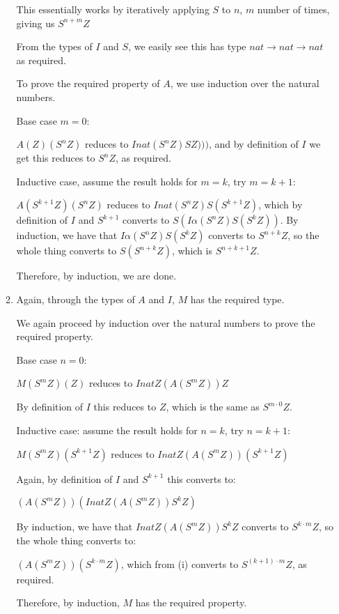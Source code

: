 \begin{enumerate}[label=(\alph*)]
\begin{enumerate}[label=(\roman*)]
                This essentially works by iteratively applying $S$ to $n$, $m$ number of times, giving us $S^{n+m}Z$

                From the types of $I$ and $S$, we easily see this has type $nat \rightarrow nat \rightarrow nat$ as required.

                To prove the required property of $A$, we use induction over the natural numbers.

                Base case $m=0$:

                $A(Z)(S^n Z)$ reduces to $I nat (S^n Z) S Z)))$, and by definition of $I$ we get this reduces to $S^n Z$, as required.

                Inductive case, assume the result holds for $m=k$, try $m=k+1$:

                $A(S^{k+1}Z)(S^n Z)$ reduces to $I nat (S^nZ) S (S^{k+1}Z)$, which by definition of $I$ and $S^{k+1}$ converts to $S(I \alpha (S^nZ) S (S^k Z))$. By induction, we have that $I \alpha (S^n Z) S (S^k Z)$ converts to $S^{n+k}Z$, so the whole thing converts to $S (S^{n+k} Z)$, which is $S^{n+k+1} Z$.

                Therefore, by induction, we are done.

            \item
                Again, through the types of $A$ and $I$, $M$ has the required type.

                We again proceed by induction over the natural numbers to prove the required property.

                Base case $n=0$:

                $M(S^m Z)(Z)$ reduces to $I nat Z (A (S^m Z)) Z$

                By definition of $I$ this reduces to $Z$, which is the same as $S^{m \cdot 0} Z$.

                Inductive case: assume the result holds for $n=k$, try $n=k+1$:

                $M(S^m Z)(S^{k+1}Z)$ reduces to $I nat Z (A (S^m Z)) (S^{k+1} Z)$

                Again, by definition of $I$ and $S^{k+1}$ this converts to:

                $(A (S^m Z)) (I nat Z (A (S^m Z)) S^k Z)$

                By induction, we have that $I nat Z (A (S^m Z)) S^k Z$ converts to $S^{k \cdot m} Z$, so the whole thing converts to:

                $(A (S^m Z)) (S^{k\cdot m} Z)$, which from (i) converts to $S^{(k+1) \cdot m} Z$, as required.

                Therefore, by induction, $M$ has the required property.




            
        \end{enumerate}



        
    \end{enumerate}

